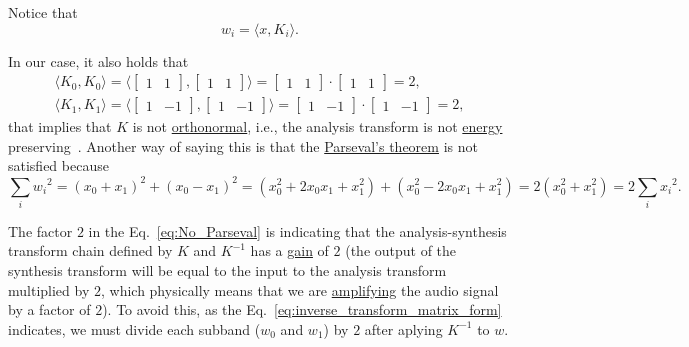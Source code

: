 Notice that
\begin{equation}
  w_i = \langle x, K_i\rangle.
\end{equation}

In our case, it also holds that
\begin{equation}
\begin{array}{l}
  \langle K_0,K_0 \rangle =
  \langle \begin{bmatrix}
    1 & 1
  \end{bmatrix}
  ,
  \begin{bmatrix}
    1 & 1
  \end{bmatrix}
  \rangle =
  \begin{bmatrix}
    1 & 1
  \end{bmatrix}
  \cdot
  \begin{bmatrix}
    1 & 1
  \end{bmatrix}
   = 2,
   \\
     \langle K_1,K_1 \rangle =
  \langle \begin{bmatrix}
    1 & -1
  \end{bmatrix}
  ,
  \begin{bmatrix}
    1 & -1
  \end{bmatrix}
  \rangle =
  \begin{bmatrix}
    1 & -1
  \end{bmatrix}
  \cdot
  \begin{bmatrix}
    1 & -1
  \end{bmatrix}
   = 2,
   \end{array}
\end{equation}
that implies that $K$ is not
\href{https://en.wikipedia.org/wiki/Orthonormality}{orthonormal},
i.e., the analysis transform is not
\href{https://en.wikipedia.org/wiki/Energy_(signal_processing)}{energy}
preserving~\cite{sayood2017introduction}. Another way of saying this
is that the \href{https://en.wikipedia.org/wiki/Parseval%27s_theorem}{Parseval's theorem}
  is not satisfied because
\begin{equation}
  \sum_i {w_i}^2 =
  (x_0+x_1)^2 + (x_0-x_1)^2 =
  (x_0^2+2x_0x_1+x_1^2) + (x_0^2-2x_0x_1+x_1^2) =
  2(x_0^2+x_1^2) =
  2\sum_i {x_i}^2.
  \label{eq:No_Parseval}
\end{equation}

The factor $2$ in the Eq.~\ref{eq:No_Parseval} is indicating that the
analysis-synthesis transform chain defined by $K$ and $K^{-1}$ has a
\href{https://en.wikipedia.org/wiki/Gain_(electronics)}{gain} of $2$
(the output of the synthesis transform will be equal to the input to
the analysis transform multiplied by $2$, which physically means that
we are \href{https://en.wikipedia.org/wiki/Amplifier}{amplifying} the
audio signal by a factor of $2$). To avoid this, as the
Eq.~\ref{eq:inverse_transform_matrix_form} indicates, we must divide
each subband ($w_0$ and $w_1$) by $2$ after aplying $K^{-1}$ to $w$.

